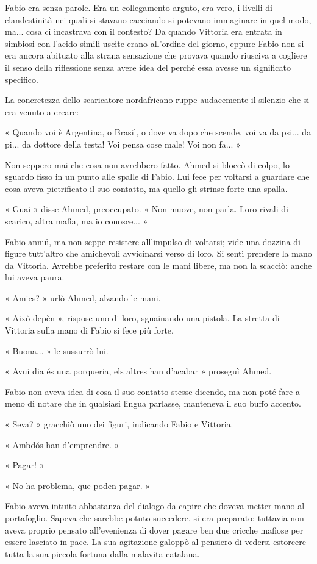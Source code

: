 Fabio era senza parole. Era un collegamento arguto, era vero, i livelli di clandestinità nei quali si stavano cacciando si potevano immaginare in quel modo, ma... cosa ci incastrava con il contesto? Da quando Vittoria era entrata in simbiosi con l'acido simili uscite erano all'ordine del giorno, eppure Fabio non si era ancora abituato alla strana sensazione che provava quando riusciva a cogliere il senso della riflessione senza avere idea del perché essa avesse un significato specifico.

La concretezza dello scaricatore nordafricano ruppe audacemente il silenzio che si era venuto a creare:

« Quando voi è Argentina, o Brasil, o dove va dopo che scende, voi va da psi... da pi... da dottore della testa! Voi pensa cose male! Voi non fa... »

Non seppero mai che cosa non avrebbero fatto. Ahmed si bloccò di colpo, lo sguardo fisso in un punto alle spalle di Fabio. Lui fece per voltarsi a guardare che cosa aveva pietrificato il suo contatto, ma quello gli strinse forte una spalla.

« Guai » disse Ahmed, preoccupato. « Non muove, non parla. Loro rivali di scarico, altra mafia, ma io conosce... »

Fabio annuì, ma non seppe resistere all'impulso di voltarsi; vide una dozzina di figure tutt'altro che amichevoli avvicinarsi verso di loro. Si sentì prendere la mano da Vittoria. Avrebbe preferito restare con le mani libere, ma non la scacciò: anche lui aveva paura.

« Amics? » urlò Ahmed, alzando le mani.

« Això depèn », rispose uno di loro, sguainando una pistola. La stretta di Vittoria sulla mano di Fabio si fece più forte.

« Buona... » le sussurrò lui.

« Avui dia és una porqueria, els altres han d'acabar » proseguì Ahmed.

Fabio non aveva idea di cosa il suo contatto stesse dicendo, ma non poté fare a meno di notare che in qualsiasi lingua parlasse, manteneva il suo buffo accento.

« Seva? » gracchiò uno dei figuri, indicando Fabio e Vittoria.

« Ambdós han d'emprendre. »

« Pagar! »

« No ha problema, que poden pagar. »

Fabio aveva intuito abbastanza del dialogo da capire che doveva metter mano al portafoglio. Sapeva che sarebbe potuto succedere, si era preparato; tuttavia non aveva proprio pensato all'evenienza di dover pagare ben due cricche mafiose per essere lasciato in pace. La sua agitazione galoppò al pensiero di vedersi estorcere tutta la sua piccola fortuna dalla malavita catalana.

